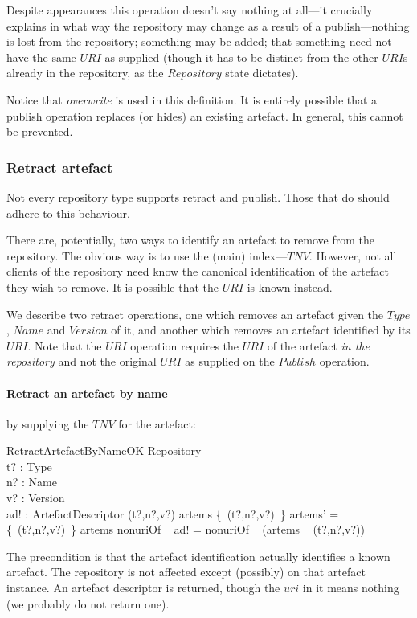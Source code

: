 \documentclass[a4paper,titlepage,twoside,12pt]{article}
\begin{document}
Despite appearances this operation doesn't say nothing at all---it crucially explains in what way the repository may change as a result of a publish---nothing is lost from the repository; something may be added; that something need not have the same $URI$ as supplied (though it has to be distinct from the other $URI$s already in the repository, as the $Repository$ state dictates).

Notice that \emph{overwrite} is used in this definition. It is entirely possible that a publish operation replaces (or hides) an existing artefact. In general, this cannot be prevented.

\subsubsection{Retract artefact}
Not every repository type supports retract and publish. Those that do should adhere to this behaviour.

There are, potentially, two ways to identify an artefact to remove from the repository. The obvious way is to use the (main) index---$TNV$. However, not all clients of the repository need know the canonical identification of the artefact they wish to remove. It is possible that the $URI$ is known instead.

We describe two retract operations, one which removes an artefact given the $Type$, $Name$ and $Version$ of it, and another which removes an artefact identified by its $URI$. Note that the $URI$ operation requires the $URI$ of the artefact \emph{in the repository} and not the original $URI$ as supplied on the $Publish$ operation.

\paragraph{Retract an artefact by name}
by supplying the $TNV$ for the artefact:
\begin{schema}{RetractArtefactByNameOK}
	\Delta Repository	\\
	t? : Type	\\
	n? : Name	\\
	v? : Version	\\
	ad! : ArtefactDescriptor
\where
	(t?,n?,v?) \in \dom artems
\also
	\{~(t?,n?,v?)~\} \ndres artems' = \{~(t?,n?,v?)~\} \ndres artems
\also
	nonuriOf ~ ad! = nonuriOf ~ (artems ~ (t?,n?,v?))
\end{schema}
The precondition is that the artefact identification actually identifies a known artefact.
The repository is not affected except (possibly) on that artefact instance.
An artefact descriptor is returned, though the $uri$ in it means nothing (we probably do not return one).
\end{document}
